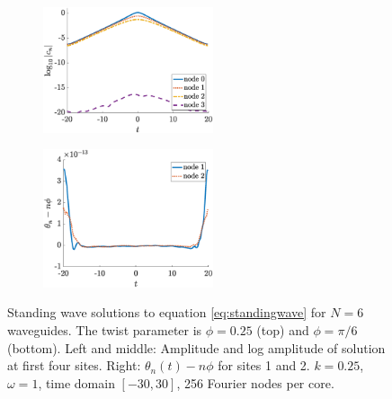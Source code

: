 \documentclass[11pt,reqno]{amsart}
\begin{document}
\begin{figure}
\begin{subfigure}{0.3\linewidth}
    \end{subfigure}
    \begin{subfigure}{0.3\linewidth}
        \caption{}
        \label{fig:m6pi6logamp}
        \includegraphics[width=5cm]{m6phipi6logamp.eps}
    \end{subfigure}
        \begin{subfigure}{0.3\linewidth}
        \caption{}
        \label{fig:m6pi6phase}
        \includegraphics[width=5cm]{m6phipi6phase.eps}
    \end{subfigure}
    \caption{Standing wave solutions to equation \cref{eq:standingwave} for $N=6$ waveguides. The twist parameter is $\phi = 0.25$ (top) and $\phi = \pi/6$ (bottom). Left and middle: Amplitude and log amplitude of solution at first four sites. Right: $\theta_n(t) - n \phi$ for sites 1 and 2. $k=0.25$, $\omega=1$, time domain $[-30,30]$, 256 Fourier nodes per core.}
    \label{fig:m6sol}
\end{figure}
\end{document}
